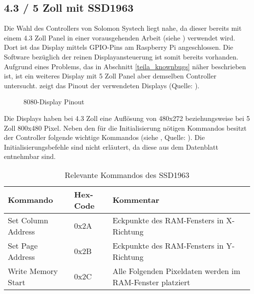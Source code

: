 \subsection{4.3 / 5 Zoll mit SSD1963}
Die Wahl des Controllers  von Solomon Systech liegt nahe, da dieser bereits mit einem 4.3 Zoll  Panel in einer vorausgehenden Arbeit (siehe \cite{Schlegel2013a}) verwendet wird. Dort ist das Display mittels GPIO-Pins am Raspberry Pi angeschlossen. Die Software bezüglich der reinen Displayansteuerung ist somit bereits vorhanden. Aufgrund eines Problems, das in Abschnitt \ref{teila_knownbugs} näher beschrieben ist, ist ein weiteres Display mit 5 Zoll Panel aber demselben Controller untersucht. 
 zeigt das Pinout der verwendeten Displays (Quelle: \cite{Coldtears2014}).
\begin{figure}[h]
	\centering
{}
	\caption{8080-Display Pinout}
	\label{fig:8080_pinout}
\end{figure}
Die Displays haben bei 4.3 Zoll eine Auflösung von 480x272 beziehungsweise bei 5 Zoll 800x480 Pixel. Neben den für die Initialisierung nötigen Kommandos besitzt der Controller folgende wichtige Kommandos (siehe , Quelle: \cite{SSD2008}). Die Initialisierungsbefehle sind nicht erläutert, da diese aus dem Datenblatt entnehmbar sind.
\begin{table}[h]
\begin{tabular}{|p{4cm}|p{1cm}|p{8cm}|}\hline
\rowcolor{TableBackgroundColor} 
   \textbf{Kommando} & \textbf{Hex-Code} & \textbf{Kommentar}\\ \hline
   Set Column Address & 0x2A & Eckpunkte des RAM-Fensters in X-Richtung \\ \hline
   Set Page Address & 0x2B & Eckpunkte des RAM-Fensters in Y-Richtung \\ \hline
   Write Memory Start & 0x2C & Alle Folgenden Pixeldaten werden im RAM-Fenster platziert \\ \hline
\end{tabular}
\caption{Relevante Kommandos des SSD1963}
\label{tab:Kommandos_SSD1963}
\end{table}
